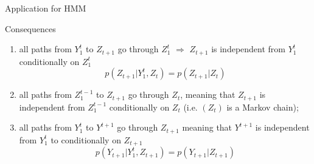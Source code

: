 \documentclass[compress,10pt]{beamer}
\begin{document}
\begin{frame}{Application for HMM}

\textcolor{dgreen}{Consequences} 
\begin{enumerate}[($a$)]
 \item all paths from $Y_1^t$ to $Z_{t+1}$ go through $Z_1^t$  \textcolor{dgreen}{$\Rightarrow$}  
 $Z_{t+1} $ is independent from $Y_1^t$ conditionally on $Z_1^t$
 $$p(Z_{t+1} | Y_1^t, Z_t) = p(Z_{t+1} |Z_t)$$
\item all paths from $Z_1^{t-1}$ to $Z_{t+1}$ go through $Z_t$, meaning that $Z_{t+1}$ is independent from $Z_1^{t-1}$ conditionally on $Z_t$ (i.e. $(Z_t)$ is a Markov chain);
 \item all paths from $Y_1^t$ to $Y^{t+1}$ go through $Z_ {t+1}$ meaning that $Y^{t+1}$ is independent from $Y_1^t$ to  conditionally on $Z_ {t+1}$ %
 $$p(Y_{t+1} | Y_1^t, Z_{t+1}) = p(Y_{t+1} |Z_{t+1})$$
\end{enumerate}

\end{frame}
\end{document}
